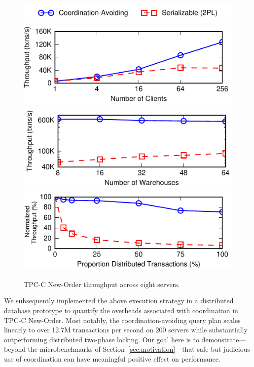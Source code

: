 \begin{figure}
\hspace{1.5em}\includegraphics[width=.6\columnwidth]{figs/ca_serial_legend.pdf}
\includegraphics[width=.6\columnwidth]{figs/client_thru.pdf}
\includegraphics[width=.6\columnwidth]{figs/wh_thru.pdf}
\includegraphics[width=.6\columnwidth]{figs/remote_thru.pdf}\vspace{.5em}
\caption{TPC-C New-Order throughput across eight servers.}
\label{fig:clients}
\end{figure}


We subsequently implemented the above execution strategy in a
distributed database prototype to quantify the overheads associated
with coordination in TPC-C New-Order. Most notably, the
coordination-avoiding query plan scales linearly to over 12.7M
transactions per second on $200$ servers while substantially
outperforming distributed two-phase locking. Our goal here is to
demonstrate---beyond the microbenchmarks of
Section~\ref{sec:motivation}---that safe but judicious use of
coordination can have meaningful positive effect on performance.


